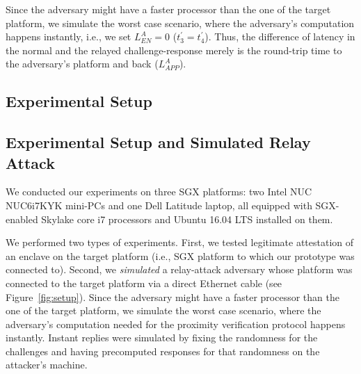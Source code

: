 Since the adversary might have a faster processor than the one of the target platform, we simulate the worst case scenario, where the adversary's computation happens instantly, i.e., we set $L_{EN}^A=0$ ($t_{3}^\prime=t_{4}^\prime$).
%
Thus, the difference of latency in the normal and the relayed challenge-response merely is the round-trip time to the adversary's platform and back ($L_{APP}^A$).
\fi

\ifusenix
\subsection{Experimental Setup}
\else
\subsection{Experimental Setup and Simulated Relay Attack}
\fi
\label{sec:evaluation:exp}

We conducted our experiments on three SGX platforms: two Intel NUC NUC6i7KYK mini-PCs and one Dell Latitude laptop, all equipped with SGX-enabled Skylake core i7 processors and Ubuntu 16.04 LTS installed on them.

We performed two types of experiments. First, we tested legitimate attestation of an enclave on the target platform (i.e., SGX platform to which our \device prototype was connected to). Second, we \emph{simulated} a relay-attack adversary whose platform was connected to the target platform via a direct Ethernet cable (see Figure~\ref{fig:setup}). Since the adversary might have a faster processor than the one of the target platform, we simulate the worst case scenario, where the adversary's computation needed for the proximity verification protocol happens instantly. Instant replies were simulated by fixing the randomness for the challenges and having precomputed responses for that randomness on the attacker's machine. 


